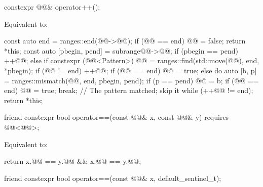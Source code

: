 %
\begin{itemdecl}
constexpr @@& operator++();
\end{itemdecl}

\begin{itemdescr}
\pnum
\effects
Equivalent to:
\begin{codeblock}
const auto end = ranges::end(@@->@@);
if (@@ == end) {
  @@ = false;
  return *this;
}
const auto [pbegin, pend] = subrange{@@->@@};
if (pbegin == pend) ++@@;
else if constexpr (@@<Pattern>) {
  @@ = ranges::find(std::move(@@), end, *pbegin);
  if (@@ != end) {
    ++@@;
    if (@@ == end)
      @@ = true;
  }
}
else {
  do {
    auto [b, p] = ranges::mismatch(@@, end, pbegin, pend);
    if (p == pend) {
      @@ = b;
      if (@@ == end)
        @@ = true;
      break;            // The pattern matched; skip it
    }
  } while (++@@ != end);
}
return *this;
\end{codeblock}
\end{itemdescr}

%
\begin{itemdecl}
friend constexpr bool operator==(const @@& x, const @@& y)
  requires @@<@@>;
\end{itemdecl}

\begin{itemdescr}
\pnum
\effects
Equivalent to:
\begin{codeblock}
return x.@@ == y.@@ && x.@@ == y.@@;
\end{codeblock}
\end{itemdescr}

%
\begin{itemdecl}
friend constexpr bool operator==(const @@& x, default_sentinel_t);
\end{itemdecl}

